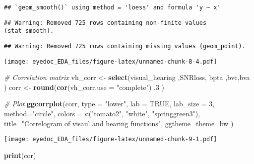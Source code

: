 \documentclass[]{article}
\newenvironment{Shaded}{\begin{snugshade}}{\end{snugshade}}
\newcommand{\CommentTok}[1]{\textcolor[rgb]{0.56,0.35,0.01}{\textit{#1}}}
\newcommand{\DataTypeTok}[1]{\textcolor[rgb]{0.13,0.29,0.53}{#1}}
\newcommand{\DecValTok}[1]{\textcolor[rgb]{0.00,0.00,0.81}{#1}}
\newcommand{\KeywordTok}[1]{\textcolor[rgb]{0.13,0.29,0.53}{\textbf{#1}}}
\newcommand{\NormalTok}[1]{#1}
\newcommand{\OtherTok}[1]{\textcolor[rgb]{0.56,0.35,0.01}{#1}}
\newcommand{\StringTok}[1]{\textcolor[rgb]{0.31,0.60,0.02}{#1}}
\begin{document}
\begin{verbatim}
## `geom_smooth()` using method = 'loess' and formula 'y ~ x'
\end{verbatim}

\begin{verbatim}
## Warning: Removed 725 rows containing non-finite values (stat_smooth).
\end{verbatim}

\begin{verbatim}
## Warning: Removed 725 rows containing missing values (geom_point).
\end{verbatim}

\texttt{[image: eyedoc\_EDA\_files/figure-latex/unnamed-chunk-8-4.pdf]}

\begin{Shaded}
\begin{Highlighting}[]
\CommentTok{# Correlation matrix}
\NormalTok{ vh_corr <-}\StringTok{ }\KeywordTok{select}\NormalTok{(visual_hearing ,SNRloss, bpta ,bvc,bva    ) }
\NormalTok{corr <-}\StringTok{ }\KeywordTok{round}\NormalTok{(}\KeywordTok{cor}\NormalTok{(vh_corr,}\DataTypeTok{use =} \StringTok{"complete"}\NormalTok{) ,}\DecValTok{3}\NormalTok{  )}
 
\CommentTok{# Plot}
  \KeywordTok{ggcorrplot}\NormalTok{(corr,  }
  \DataTypeTok{type =} \StringTok{"lower"}\NormalTok{,}
           \DataTypeTok{lab =} \OtherTok{TRUE}\NormalTok{, }
           \DataTypeTok{lab_size =} \DecValTok{3}\NormalTok{, }
\DataTypeTok{method=}\StringTok{"circle"}\NormalTok{, }
           \DataTypeTok{colors =} \KeywordTok{c}\NormalTok{(}\StringTok{"tomato2"}\NormalTok{, }\StringTok{"white"}\NormalTok{, }\StringTok{"springgreen3"}\NormalTok{), }
           \DataTypeTok{title=}\StringTok{"Correlogram of visaul and hearing functions"}\NormalTok{, }
           \DataTypeTok{ggtheme=}\NormalTok{theme_bw )}
\end{Highlighting}
\end{Shaded}

\texttt{[image: eyedoc\_EDA\_files/figure-latex/unnamed-chunk-9-1.pdf]}

\begin{Shaded}
\begin{Highlighting}[]
\KeywordTok{print}\NormalTok{(cor)  }
\end{Highlighting}
\end{Shaded}
\end{document}
